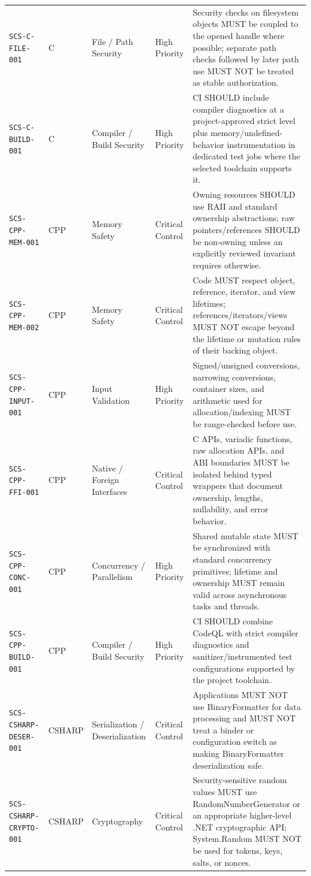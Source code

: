 \documentclass[10pt,letterpaper]{article}
\newcommand{\code}[1]{\begingroup\small\ttfamily\def\UrlFont{\ttfamily}\nolinkurl{#1}\endgroup}
\begin{document}
\begin{landscape}
\begin{longtable}{@{}P{1.3in}P{0.8in}P{1.45in}P{1.0in}P{4.65in}@{}}
\code{SCS-C-FILE-001} & C & File / Path Security & High Priority & Security checks on filesystem objects MUST be coupled to the opened handle where possible; separate path checks followed by later path use MUST NOT be treated as stable authorization.\\
\code{SCS-C-BUILD-001} & C & Compiler / Build Security & High Priority & CI SHOULD include compiler diagnostics at a project-approved strict level plus memory/undefined-behavior instrumentation in dedicated test jobs where the selected toolchain supports it.\\
\code{SCS-CPP-MEM-001} & CPP & Memory Safety & Critical Control & Owning resources SHOULD use RAII and standard ownership abstractions; raw pointers/references SHOULD be non-owning unless an explicitly reviewed invariant requires otherwise.\\
\code{SCS-CPP-MEM-002} & CPP & Memory Safety & Critical Control & Code MUST respect object, reference, iterator, and view lifetimes; references/iterators/views MUST NOT escape beyond the lifetime or mutation rules of their backing object.\\
\code{SCS-CPP-INPUT-001} & CPP & Input Validation & High Priority & Signed/unsigned conversions, narrowing conversions, container sizes, and arithmetic used for allocation/indexing MUST be range-checked before use.\\
\code{SCS-CPP-FFI-001} & CPP & Native / Foreign Interfaces & Critical Control & C APIs, variadic functions, raw allocation APIs, and ABI boundaries MUST be isolated behind typed wrappers that document ownership, lengths, nullability, and error behavior.\\
\code{SCS-CPP-CONC-001} & CPP & Concurrency / Parallelism & High Priority & Shared mutable state MUST be synchronized with standard concurrency primitives; lifetime and ownership MUST remain valid across asynchronous tasks and threads.\\
\code{SCS-CPP-BUILD-001} & CPP & Compiler / Build Security & High Priority & CI SHOULD combine CodeQL with strict compiler diagnostics and sanitizer/instrumented test configurations supported by the project toolchain.\\
\code{SCS-CSHARP-DESER-001} & CSHARP & Serialization / Deserialization & Critical Control & Applications MUST NOT use BinaryFormatter for data processing and MUST NOT treat a binder or configuration switch as making BinaryFormatter deserialization safe.\\
\code{SCS-CSHARP-CRYPTO-001} & CSHARP & Cryptography & Critical Control & Security-sensitive random values MUST use RandomNumberGenerator or an appropriate higher-level .NET cryptographic API; System.Random MUST NOT be used for tokens, keys, salts, or nonces.\\

\end{longtable}
\end{landscape}
\end{document}

